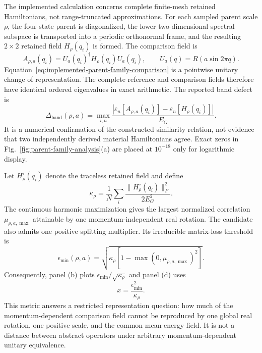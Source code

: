 \documentclass[11pt]{article}
\begin{document}
The implemented calculation concerns complete finite-mesh retained Hamiltonians, not
range-truncated approximations. For each sampled parent scale $\rho$, the four-state
parent is diagonalized, the lower two-dimensional spectral subspace is transported into
a periodic orthonormal frame, and the resulting $2\times2$ retained field $H_\rho(q_i)$
is formed. The comparison field is
\begin{equation}
 A_{\rho,a}(q_i)=U_a(q_i)^\dagger H_\rho(q_i)U_a(q_i),
 \qquad U_a(q)=R(a\sin 2\pi q).
 \label{eq:implemented-parent-family-comparison}
\end{equation}
Equation~\eqref{eq:implemented-parent-family-comparison} is a pointwise unitary change of
representation. The complete reference and comparison fields therefore have identical
ordered eigenvalues in exact arithmetic. The reported band defect is
\begin{equation}
 \Delta_{\mathrm{band}}(\rho,a)=
 \max_{i,n}\frac{|\varepsilon_n[A_{\rho,a}(q_i)]
                       -\varepsilon_n[H_\rho(q_i)]|}{E_G}.
 \label{eq:implemented-band-defect}
\end{equation}
It is a numerical confirmation of the constructed similarity relation, not evidence that
two independently derived material Hamiltonians agree. Exact zeros in
Fig.~\ref{fig:parent-family-analysis}(a) are placed at $10^{-18}$ only for logarithmic
display.

Let $H_\rho^\circ(q_i)$ denote the traceless retained field and define
\begin{equation}
 \kappa_\rho=\frac{1}{N}\sum_i
 \frac{\|H_\rho^\circ(q_i)\|_F^2}{2E_G^2}.
 \label{eq:implemented-splitting-scale}
\end{equation}
The continuous harmonic maximization gives the largest normalized correlation
$\mu_{\rho,a,\max}$ attainable by one momentum-independent real rotation. The candidate
also admits one positive splitting multiplier. Its irreducible matrix-loss threshold is
\begin{equation}
 \epsilon_{\min}(\rho,a)
 =\sqrt{\kappa_\rho\left[1-\max(0,\mu_{\rho,a,\max})^2\right]}.
 \label{eq:implemented-minimum-threshold}
\end{equation}
Consequently, panel (b) plots $\epsilon_{\min}/\sqrt{\kappa_\rho}$ and panel (d) uses
\begin{equation}
 x=\frac{\epsilon_{\min}^2}{\kappa_\rho}.
 \label{eq:implemented-normalized-residual}
\end{equation}
This metric answers a restricted representation question: how much of the
momentum-dependent comparison field cannot be reproduced by one global real rotation,
one positive scale, and the common mean-energy field. It is not a distance between
abstract operators under arbitrary momentum-dependent unitary equivalence.
\end{document}
